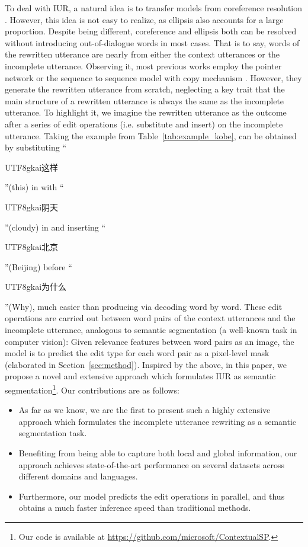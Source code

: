 \documentclass[11pt,a4paper]{article}
\newcommand{\chinese}[1]{\begin{CJK*}{UTF8}{gkai}{#1}\end{CJK*}}
\begin{document}
To deal with IUR, a natural idea is to transfer models from coreference resolution \cite{clark-manning-2016-improving}. However, this idea is not easy to realize, as ellipsis also accounts for a large proportion. Despite being different, coreference and ellipsis both can be resolved without introducing out-of-dialogue words in most cases. That is to say, words of the rewritten utterance are nearly from either the context utterances or the incomplete utterance. Observing it, most previous works employ the pointer network \cite{oriol-2015-pointer} or the sequence to sequence model with copy mechanism \cite{gu-etal-2016-incorporating,see-etal-2017-get}. However, they generate the rewritten utterance from scratch, neglecting a key trait that the main structure of a rewritten utterance is always the same as the incomplete utterance. To highlight it, we imagine the rewritten utterance as the outcome after a series of edit operations (i.e. substitute and insert) on the incomplete utterance. Taking the example from Table~\ref{tab:example_kobe},  can be obtained by substituting ``\chinese{这样}''(this) in  with ``\chinese{阴天}''(cloudy) in  and inserting ``\chinese{北京}''(Beijing) before ``\chinese{为什么}''(Why), much easier than producing  via decoding word by word. These edit operations are carried out between word pairs of the context utterances and the incomplete utterance, analogous to semantic segmentation (a well-known task in computer vision): Given relevance features between word pairs as an image, the model is to predict the edit type for each word pair as a pixel-level mask (elaborated in Section~\ref{sec:method}). Inspired by the above, in this paper, we propose a novel and extensive approach which formulates IUR as semantic segmentation\footnote{Our code is available at \url{https://github.com/microsoft/ContextualSP}.}. Our contributions are as follows:


\begin{itemize}[leftmargin=*]\setlength\itemsep{-0.2em}
    \item As far as we know, we are the first to present such a highly extensive approach which formulates the incomplete utterance rewriting as a semantic segmentation task. 
    \item Benefiting from being able to capture both local and global information, our approach achieves state-of-the-art performance on several datasets across different domains and languages.
    \item Furthermore, our model predicts the edit operations in parallel, and thus obtains a much faster inference speed than traditional methods.
\end{itemize}
\end{document}
